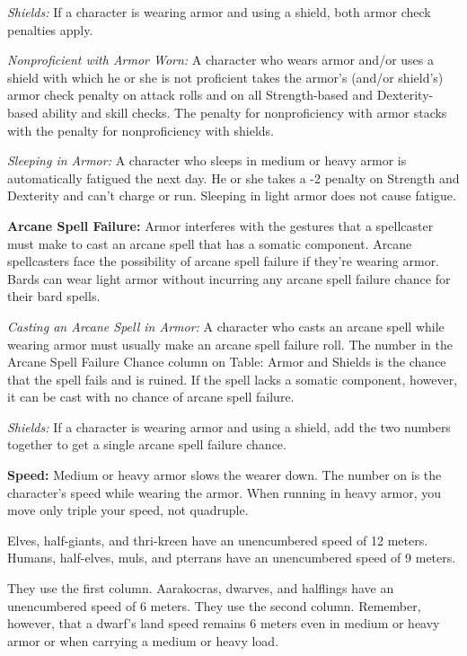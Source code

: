 \textit{Shields:} If a character is wearing armor and using a shield, both armor check penalties apply.

\textit{Nonproficient with Armor Worn:} A character who wears armor and/or uses a shield with which he or she is not proficient takes the armor's (and/or shield's) armor check penalty on attack rolls and on all Strength-based and Dexterity-based ability and skill checks. The penalty for nonproficiency with armor stacks with the penalty for nonproficiency with shields.

\textit{Sleeping in Armor:} A character who sleeps in medium or heavy armor is automatically fatigued the next day. He or she takes a -2 penalty on Strength and Dexterity and can't charge or run. Sleeping in light armor does not cause fatigue.

\textbf{Arcane Spell Failure:} Armor interferes with the gestures that a spellcaster must make to cast an arcane spell that has a somatic component. Arcane spellcasters face the possibility of arcane spell failure if they're wearing armor. Bards can wear light armor without incurring any arcane spell failure chance for their bard spells.

\textit{Casting an Arcane Spell in Armor:} A character who casts an arcane spell while wearing armor must usually make an arcane spell failure roll. The number in the Arcane Spell Failure Chance column on Table: Armor and Shields is the chance that the spell fails and is ruined. If the spell lacks a somatic component, however, it can be cast with no chance of arcane spell failure.

\textit{Shields:} If a character is wearing armor and using a shield, add the two numbers together to get a single arcane spell failure chance.

\textbf{Speed:} Medium or heavy armor slows the wearer down. The number on  is the character's speed while wearing the armor. When running in heavy armor, you move only triple your speed, not quadruple.

Elves, half-giants, and thri-kreen have an unencumbered speed of 12 meters. Humans, half-elves, muls, and pterrans have an unencumbered speed of 9 meters.

They use the first column. Aarakocras, dwarves, and halflings have an unencumbered speed of 6 meters. They use the second column. Remember, however, that a dwarf's land speed remains 6 meters even in medium or heavy armor or when carrying a medium or heavy load.

